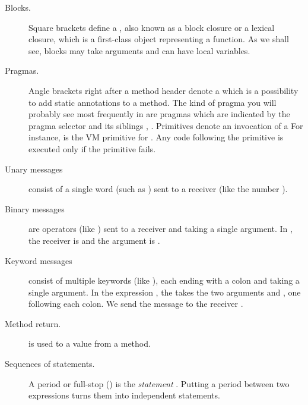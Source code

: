\documentclass[a4paper,10pt,twoside]{book}
\begin{document}
\begin{description}
\item[Blocks.]
	Square brackets \ct{[ ]} define a , also known as a block closure or a lexical closure, which is a first-class object representing a function.
	As we shall see, blocks may take arguments and can have local variables.

\item[Pragmas.]
	Angle brackets \ct{< >} right after a method header denote a  which is a possibility to add static annotations to a method.
	The kind of pragma you will probably see most frequently in \sq are \emph{} pragmas which are indicated by the pragma selector  and its siblings ,  \etc.
	Primitives denote an invocation of a  
	For instance,  is the VM primitive for .
	Any code following the primitive is executed only if the primitive fails.

\item[Unary messages] consist of a single word (such as ) sent to a receiver (like the number ).

\item[Binary messages] are operators (like \ct{+}) sent to a receiver and taking a single argument.
	In , the receiver is  and the argument is .

\item[Keyword messages] consist of multiple keywords (like ), each ending with a colon and taking a single argument. 
	In the expression , the   takes the two arguments  and , one following each colon.
	We send the message to the receiver .

\item[Method return.]
	\ct{^} is used to  a value from a method. 

\item[Sequences of statements.]
	A period or full-stop () is the \emph{statement} .
	Putting a period between two expressions turns them into independent statements.	


\end{description}
\end{document}
